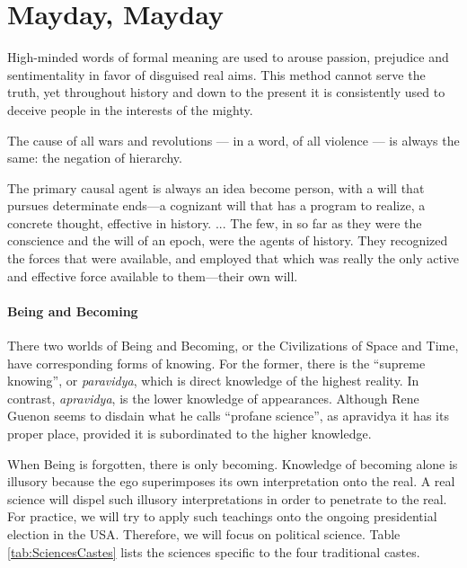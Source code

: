 \section{Mayday, Mayday}

\begin{quotex}
High-minded words of formal meaning are used to arouse passion, prejudice and sentimentality in favor of disguised real aims. This method cannot serve the truth, yet throughout history and down to the present it is consistently used to deceive people in the interests of the mighty.

The cause of all wars and revolutions --- in a word, of all violence --- is always the same: the negation of hierarchy.

The primary causal agent is always an idea become person, with a will that pursues determinate ends---a cognizant will that has a program to realize, a concrete thought, effective in history. ... The few, in so far as they were the conscience and the will of an epoch, were the agents of history. They recognized the forces that were available, and employed that which was really the only active and effective force available to them---their own will.
\end{quotex}


\paragraph{Being and Becoming}


There two worlds of Being and Becoming, or the Civilizations of Space and Time, have corresponding forms of knowing. For the former, there is the ``supreme knowing'', or \emph{paravidya}, which is direct knowledge of the highest reality. In contrast, \emph{apravidya}, is the lower knowledge of appearances. Although Rene Guenon seems to disdain what he calls ``profane science'', as apravidya it has its proper place, provided it is subordinated to the higher knowledge.

When Being is forgotten, there is only becoming. Knowledge of becoming alone is illusory because the ego superimposes its own interpretation onto the real. A real science will dispel such illusory interpretations in order to penetrate to the real. For practice, we will try to apply such teachings onto the ongoing presidential election in the USA. Therefore, we will focus on political science. Table \ref{tab:SciencesCastes} lists the sciences specific to the four traditional castes.

